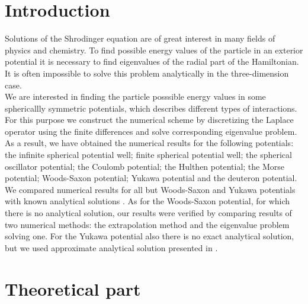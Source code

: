 \documentclass[a4paper, 11pt]{article}
\begin{document}
	
\section{Introduction}

Solutions of the Shrodinger equation are of great interest in many fields of physics and chemistry.  To find possible energy values of the particle in an exterior potential it is necessary to find eigenvalues of the radial part of the Hamiltonian. It is often impossible to solve this problem analytically in the three-dimension case. \\
We are interested in finding the particle posssible energy values in some sphericallly symmetric potentials, which describes different types of interactions. For this purpose we construct the  numerical scheme by discretizing the Laplace  operator using the finite differences and solve corresponding eigenvalue problem.\\
As a result, we have obtained the numerical results for the following potentials:  the infinite spherical potential well; finite spherical potential well; the spherical oscillator potential; the Coulomb potential; the Hulthen potential; the Morse potential; Woods-Saxon potential; Yukawa potential and the deuteron potential. We compared numerical results for all but Woods-Saxon and Yukawa potentials with known analytical solutions \cite{flugge2012practical}. As for the Woods-Saxon potential, for which there is no analytical solution, our results were verified by comparing results of two numerical methods: the extrapolation method and the eigenvalue problem solving one. For the Yukawa potential also there is no exact analytical solution, but we used approximate analytical solution presented in \cite{hamzavi2012approximate}.




\section{Theoretical part}
\end{document}
